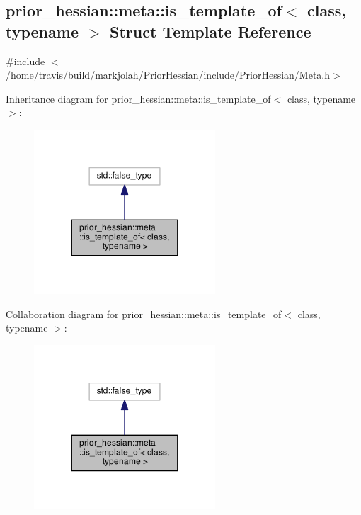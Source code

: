 \hypertarget{structprior__hessian_1_1meta_1_1is__template__of}{}\subsection{prior\+\_\+hessian\+:\+:meta\+:\+:is\+\_\+template\+\_\+of$<$ class, typename $>$ Struct Template Reference}
\label{structprior__hessian_1_1meta_1_1is__template__of}


{\ttfamily \#include $<$/home/travis/build/markjolah/\+Prior\+Hessian/include/\+Prior\+Hessian/\+Meta.\+h$>$}



Inheritance diagram for prior\+\_\+hessian\+:\+:meta\+:\+:is\+\_\+template\+\_\+of$<$ class, typename $>$\+:\nopagebreak
\begin{figure}[H]
\begin{center}
\leavevmode
\includegraphics[width=192pt]{structprior__hessian_1_1meta_1_1is__template__of__inherit__graph}
\end{center}
\end{figure}


Collaboration diagram for prior\+\_\+hessian\+:\+:meta\+:\+:is\+\_\+template\+\_\+of$<$ class, typename $>$\+:\nopagebreak
\begin{figure}[H]
\begin{center}
\leavevmode
\includegraphics[width=192pt]{structprior__hessian_1_1meta_1_1is__template__of__coll__graph}
\end{center}
\end{figure}


